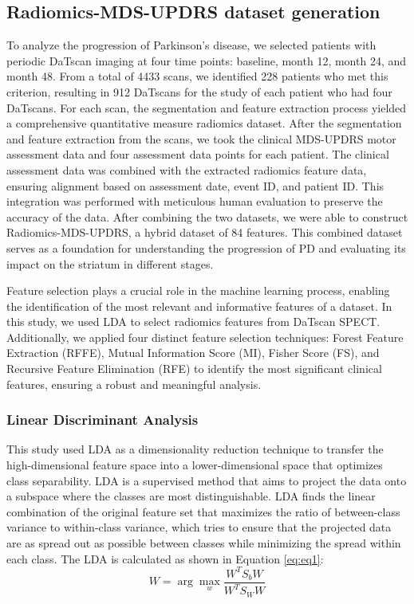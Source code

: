 \documentclass[twocolumn]{article}
\begin{document}
\subsection{Radiomics-MDS-UPDRS dataset generation}

To analyze the progression of Parkinson’s disease, we selected patients with periodic DaTscan imaging at four time points: baseline, month 12, month 24, and month 48. From a total of 4433 scans, we identified 228 patients who met this criterion, resulting in 912 DaTscans for the study of each patient who had four DaTscans. For each scan, the segmentation and feature extraction process yielded a comprehensive quantitative measure radiomics dataset. After the segmentation and feature extraction from the scans, we took the clinical MDS-UPDRS motor assessment data and four assessment data points for each patient. The clinical assessment data was combined with the extracted radiomics feature data, ensuring alignment based on assessment date, event ID, and patient ID. This integration was performed with meticulous human evaluation to preserve the accuracy of the data. After combining the two datasets, we were able to construct Radiomics-MDS-UPDRS, a hybrid dataset of 84 features. This combined dataset serves as a foundation for understanding the progression of PD and evaluating its impact on the striatum in different stages.





Feature selection plays a crucial role in the machine learning process, enabling the identification of the most relevant and informative features of a dataset. In this study, we used LDA to select radiomics features from DaTscan SPECT. Additionally, we applied four distinct feature selection techniques: Forest Feature Extraction (RFFE), Mutual Information Score (MI), Fisher Score (FS), and Recursive Feature Elimination (RFE) to identify the most significant clinical features, ensuring a robust and meaningful analysis.


\subsubsection{Linear Discriminant Analysis}

This study used LDA as a dimensionality reduction technique to transfer the high-dimensional feature space into a lower-dimensional space that optimizes class separability. LDA is a supervised method that aims to project the data onto a subspace where the classes are most distinguishable. LDA finds the linear combination of the original feature set that maximizes the ratio of between-class variance to within-class variance, which tries to ensure that the projected data are as spread out as possible between classes while minimizing the spread within each class. The LDA is calculated as shown in Equation \eqref{eq:eq1}:
\begin{equation}
    W = \arg\max_w \frac{W^T S_b W}{W^T S_W W}
    \label{eq:eq1}
\end{equation}
\end{document}
